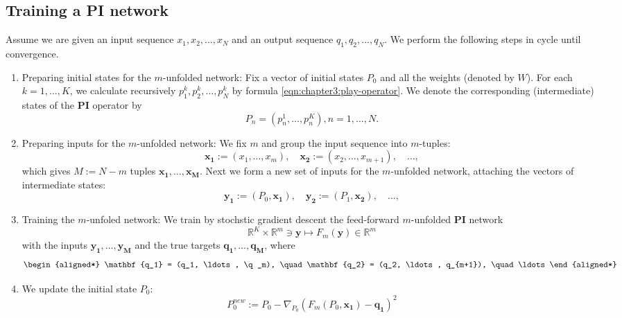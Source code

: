 \subsection{Training a PI network\label{sec:chapter3:training-pi-network}}
Assume we are given an input sequence $x_1, x_2, \ldots, x_N$ and an output sequence $q_1, q_2, \ldots, q_N$. We perform the following steps in cycle until convergence.

\begin{enumerate}
\item Preparing initial states for the $m$-unfolded network: Fix a vector of initial states $P_0$ and all the weights (denoted by $W$). For each $k=1, \ldots, K$, we calculate recursively $p_{1}^{k}, p_{2}^{k}, \ldots, p_{N}^{k}$ by formula \ref{eqn:chapter3:play-operator}. We denote the corresponding (intermediate) states of the \textbf{PI} operator by
  \begin{equation*}
    P_n = (p_{n}^{1}, \ldots, p_{n}^{K}), n = 1, \ldots, N.
  \end{equation*}
\item Preparing inputs for the $m$-unfolded network: We fix $m$ and group the input sequence into $m$-tuples:
  \begin{equation*}
    \mathbf{x_1} := (x_1, \ldots, x_m), \quad \mathbf{x_2} := (x_2, \ldots, x_{m+1}), \quad \ldots,
  \end{equation*}
  which gives $M := N-m$ tuples $\mathbf{x_1}, \ldots, \mathbf{x_M}$. Next we form a new set of inputs for the $m$-unfolded network, attaching the vectors of intermediate states:
  \begin{equation*}
    \mathbf{y_1} := (P_0, \mathbf{x_1}), \quad \mathbf{y_2} := (P_1, \mathbf{x_2}), \quad \ldots,
  \end{equation*}

\item Training the $m$-unfoled network: We train by stochstic gradient descent the feed-forward $m$-unfolded \textbf{PI} network
  \begin{equation*}
    \mathbb{R}^{K} \times \mathbb{R}^{m} \ni \mathbf{y} \mapsto F_{m}(\mathbf{y}) \in \mathbb{R}^m
  \end{equation*}
  with the inputs $\mathbf{y_1}, \ldots, \mathbf{y_M}$ and the true targets $\mathbf{q_1}, \ldots, \mathbf{q_M}$, where
  \begin{equation*}
    \begin{aligned*}
      \mathbf{q_1} = (q_1, \ldots, \q_m), \quad \mathbf{q_2} = (q_2, \ldots, q_{m+1}), \quad \ldots
    \end{aligned*}
  \end{equation*}

\item We update the initial state $P_0$:
  \begin{equation*}
    P_{0}^{new} := P_{0} - \nabla_{P_0} (F_m(P_0, \mathbf{x_1}) - \mathbf{q_1})^2
  \end{equation*}
\end{enumerate}
